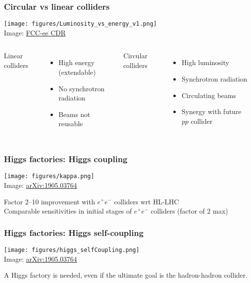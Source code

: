 \documentclass[aspectratio=169]{beamer}
\newcommand{\bluetext}[1]{%
  \textcolor{myBlue}{#1}
}
\begin{document}
\begin{frame}
  \frametitle{Circular vs linear colliders}

  \begin{center}
    \texttt{[image: figures/Luminosity\_vs\_energy\_v1.png]}\\
     \tiny{Image: \href{https://cds.cern.ch/record/2651299?ln=en}{FCC-ee CDR}}
  \end{center}
  \vspace{1ex}

  \begin{columns}
     \bluetext{Linear colliders}
     \begin{itemize}
     \item High energy (extendable)
     \item No synchrotron radiation
     \item Beams not reusable
     \end{itemize}

     \bluetext{Circular colliders}
     \begin{itemize}
     \item High luminosity
     \item Synchrotron radiation
     \item Circulating beams
     \item Synergy with future $pp$ collider
     \end{itemize}
   \end{columns}
\end{frame}


\begin{frame}
  \frametitle{Higgs factories: Higgs coupling}
  \begin{center}
    \texttt{[image: figures/kappa.png]}\\
    \tiny{Image: \href{https://arxiv.org/abs/1905.03764}{arXiv:1905.03764}}
  \end{center}
  \pause%

  Factor 2--10 improvement with $e^+e^-$ colliders wrt HL-LHC\\
  Comparable sensitivities in initial stages of $e^+e^-$ colliders (factor of 2 max)
\end{frame}


\begin{frame}
  \frametitle{Higgs factories: Higgs self-coupling}

  \begin{center}
    \texttt{[image: figures/higgs\_selfCoupling.png]}\\
    \tiny{Image: \href{https://arxiv.org/abs/1905.03764}{arXiv:1905.03764}}
  \end{center}
  \pause

  A Higgs factory is needed, even if the ultimate goal is the hadron-hadron collider.\\
\end{frame}
\end{document}
